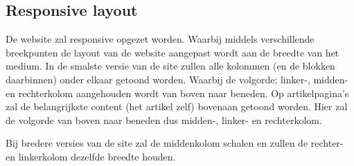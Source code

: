 \subsection{Responsive layout}
De website zal responsive opgezet worden. Waarbij middels verschillende breekpunten de layout van de website aangepast wordt aan de breedte van het medium. In de smalste versie van de site zullen alle kolommen (en de blokken daarbinnen) onder elkaar getoond worden. Waarbij de volgorde; linker-, midden- en rechterkolom aangehouden wordt van boven naar beneden. Op artikelpagina's zal de belangrijkste content (het artikel zelf) bovenaan getoond worden. Hier zal de volgorde van boven naar beneden dus midden-, linker- en rechterkolom.

Bij bredere versies van de site zal de middenkolom schalen en zullen de rechter- en linkerkolom dezelfde breedte houden.